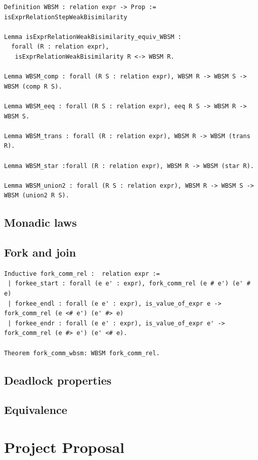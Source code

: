 \documentclass[12pt,twoside,notitlepage]{report}
\theoremstyle{plain}%
\theoremstyle{definition}
\theoremstyle{remark}
\begin{document}
\begin{minipage}{\linewidth}
\begin{lstlisting}[language={Coq}, caption={Weak bisimilarity properties}]
Definition WBSM : relation expr -> Prop := isExprRelationStepWeakBisimilarity

Lemma isExprRelationWeakBisimilarity_equiv_WBSM : 
  forall (R : relation expr), 
   isExprRelationWeakBisimilarity R <-> WBSM R.

Lemma WBSM_comp : forall (R S : relation expr), WBSM R -> WBSM S -> WBSM (comp R S).

Lemma WBSM_eeq : forall (R S : relation expr), eeq R S -> WBSM R -> WBSM S.

Lemma WBSM_trans : forall (R : relation expr), WBSM R -> WBSM (trans R).

Lemma WBSM_star :forall (R : relation expr), WBSM R -> WBSM (star R).

Lemma WBSM_union2 : forall (R S : relation expr), WBSM R -> WBSM S -> WBSM (union2 R S).
\end{lstlisting}
\end{minipage}
\section{Monadic laws}
\section{Fork and join}
\begin{minipage}{\linewidth}
\begin{lstlisting}[language={Coq}, caption={Fork commutativity}]
Inductive fork_comm_rel :  relation expr := 
 | forkee_start : forall (e e' : expr), fork_comm_rel (e # e') (e' # e)
 | forkee_endl : forall (e e' : expr), is_value_of_expr e -> fork_comm_rel (e <# e') (e' #> e)
 | forkee_endr : forall (e e' : expr), is_value_of_expr e' -> fork_comm_rel (e #> e') (e' <# e).
 
Theorem fork_comm_wbsm: WBSM fork_comm_rel.
\end{lstlisting}
\end{minipage}
\section{Deadlock properties}
\section{Equivalence}
\cleardoublepage

\chapter{Project Proposal}


\end{document}
